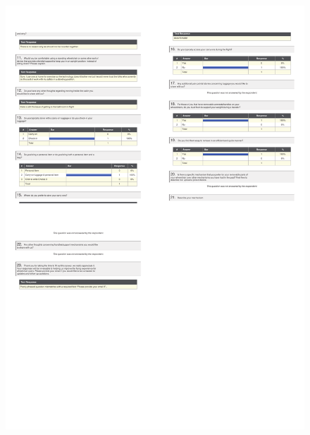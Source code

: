 \begin{figure}[h]
  \centering
     \includegraphics[scale=0.75]{images/Response4.pdf}
 \label{fig:Response4}
\end{figure}

